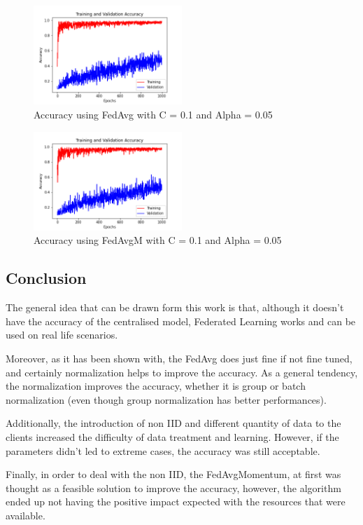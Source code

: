 \documentclass[twocolumn]{article}
\begin{document}
\begin{figure}
    \centering
    \includegraphics[width=0.5\textwidth,height=.3\textheight]{10_AccuracyFedAvg_C0.1A_0.05.png}
    \caption{Accuracy using FedAvg with C = 0.1 and Alpha = 0.05}
     \label{AccFedAvgC0.1A0.05} 
\end{figure}

\begin{figure}
    \centering
    \includegraphics[width=0.5\textwidth,height=.3\textheight]{10_AccuracyFedAvgM_C0.1_A0.05.png}
    \caption{Accuracy using FedAvgM with C = 0.1 and Alpha = 0.05}
     \label{AccFedAvgMC0.1A0.05} 
\end{figure}





\subsection{Conclusion}
The general idea that can be drawn form this work is that, although it doesn't have the accuracy of the centralised model, Federated Learning works and can be used on real life scenarios.

Moreover, as it has been shown with, the FedAvg does just fine if not fine tuned, and certainly normalization helps to improve the accuracy. As a general tendency, the normalization improves the  accuracy, whether it is group or batch normalization (even though group normalization has better performances). 

Additionally, the introduction of non IID and different quantity of data to the clients increased the difficulty of data treatment and learning. However, if the parameters didn't led to extreme cases, the accuracy was still acceptable.

Finally, in order to deal with the non IID, the FedAvgMomentum, at first was thought as a feasible solution to improve the accuracy, however, the algorithm ended up not having the positive impact expected with the resources that were available.

\printbibliography
\end{document}
